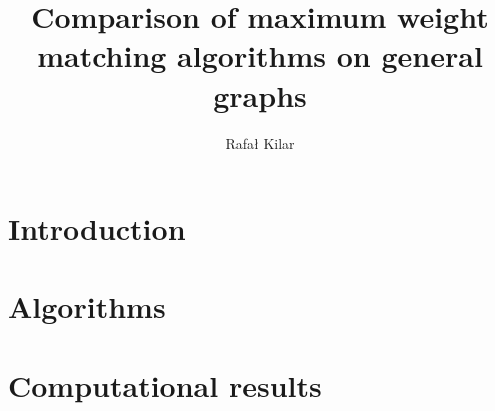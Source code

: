 \documentclass{report}
\title{Comparison of maximum weight matching algorithms on general graphs}
\author{Rafał Kilar}
\begin{document}

\pagebreak


\tableofcontents
\pagebreak

\chapter{Introduction}


\chapter{Algorithms}\label{chap:algo}


\chapter{Computational results}\label{chap:results}


\printbibliography
\end{document}
